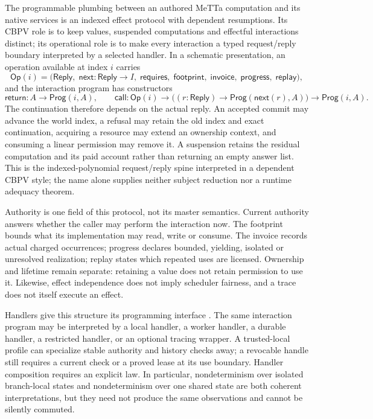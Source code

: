 \documentclass[11pt]{article}
\theoremstyle{definition}
\theoremstyle{remark}
\begin{document}
The programmable plumbing between an authored MeTTa computation and its native
services is an indexed effect protocol with dependent resumptions.  Its CBPV
role is to keep values, suspended computations and effectful interactions
distinct; its operational role is to make every interaction a typed
request/reply boundary interpreted by a selected handler.  In a schematic
presentation, an operation available at index $i$ carries
\[
  \mathsf{Op}(i)=
  \bigl(\mathsf{Reply},\;\mathsf{next}:\mathsf{Reply}\to I,\;
    \mathsf{requires},\;\mathsf{footprint},\;\mathsf{invoice},\;
    \mathsf{progress},\;\mathsf{replay}\bigr),
\]
and the interaction program has constructors
\[
  \mathsf{return}:A\to\mathsf{Prog}(i,A),\qquad
  \mathsf{call}:\mathsf{Op}(i)\to
    \bigl((r:\mathsf{Reply})\to\mathsf{Prog}(\mathsf{next}(r),A)\bigr)
    \to\mathsf{Prog}(i,A).
\]
The continuation therefore depends on the actual reply.  An accepted commit
may advance the world index, a refusal may retain the old index and exact
continuation, acquiring a resource may extend an ownership context, and
consuming a linear permission may remove it.  A suspension retains the residual
computation and its paid account rather than returning an empty answer list.
This is the indexed-polynomial request/reply spine interpreted in a dependent
CBPV style; the name alone supplies neither subject reduction nor a runtime
adequacy theorem.

Authority is one field of this protocol, not its master semantics.  Current
authority answers whether the caller may perform the interaction now.  The
footprint bounds what its implementation may read, write or consume.  The
invoice records actual charged occurrences; progress declares bounded,
yielding, isolated or unresolved realization; replay states which repeated
uses are licensed.  Ownership and lifetime remain separate: retaining a value
does not retain permission to use it.  Likewise, effect independence does not
imply scheduler fairness, and a trace does not itself execute an effect.

Handlers give this structure its programming interface
\cite{PlotkinPretnarHandling}.  The same interaction program may be interpreted
by a local handler, a worker handler, a durable handler, a restricted handler,
or an optional tracing wrapper.  A trusted-local profile can specialize stable
authority and history checks away; a revocable handle still requires a current
check or a proved lease at its use boundary.  Handler composition requires an
explicit law.  In particular, nondeterminism over isolated branch-local states
and nondeterminism over one shared state are both coherent interpretations, but
they need not produce the same observations and cannot be silently commuted.
\end{document}
